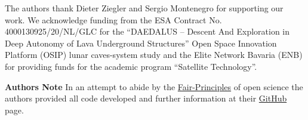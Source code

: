 \documentclass[graybox,a4paper]{svmult}
\newcommand{\1}{\mathbbm{1}}                 %
\begin{document}










\begin{acknowledgement}
The authors thank Dieter Ziegler and Sergio Montenegro for supporting our work. We acknowledge funding from the ESA Contract No. 4000130925/20/NL/GLC for the ``DAEDALUS -- Descent And Exploration in Deep Autonomy of Lava Underground Structures'' Open Space Innovation Platform (OSIP) lunar caves-system study and the Elite Network Bavaria (ENB) for providing funds for the academic program ``Satellite Technology''.

\bigskip

\noindent \textbf{Authors Note}
In an attempt to abide by the \href{https://www.go-fair.org/fair-principles}{Fair-Principles} of open science the authors provided all code developed and further information at their \href{https://github.com/fallow24/L.U.N.A}{GitHub} page.
\end{acknowledgement}



\end{document}
